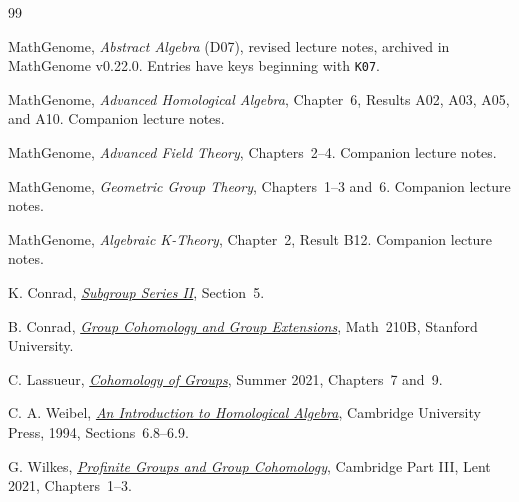 \documentclass[11pt,oneside,openany]{book}
\theoremstyle{definition}
\theoremstyle{remark}
\begin{document}
\backmatter
{\raggedright
\begin{thebibliography}{99}

MathGenome, \emph{Abstract Algebra} (D07), revised lecture notes,
archived in MathGenome v0.22.0. Entries have keys beginning with
\texttt{K07}.

MathGenome, \emph{Advanced Homological Algebra}, Chapter~6,
Results A02, A03, A05, and A10. Companion lecture notes.

MathGenome, \emph{Advanced Field Theory}, Chapters~2--4.
Companion lecture notes.

MathGenome, \emph{Geometric Group Theory}, Chapters~1--3 and~6.
Companion lecture notes.

MathGenome, \emph{Algebraic K-Theory}, Chapter~2, Result B12.
Companion lecture notes.

K. Conrad, \href{https://kconrad.math.uconn.edu/blurbs/grouptheory/subgpseries2.pdf}{\emph{Subgroup Series II}},
Section~5.

B. Conrad, \href{https://math.stanford.edu/~conrad/210BPage/handouts/gpext.pdf}{\emph{Group Cohomology and Group Extensions}},
Math~210B, Stanford University.

C. Lassueur, \href{https://classueur.github.io/maths/teaching/TUKL/SS21/COHOMSS21/CGSS21/COHOM_SS21.pdf}{\emph{Cohomology of Groups}},
Summer 2021, Chapters~7 and~9.

C. A. Weibel, \href{https://www.cambridge.org/core/books/an-introduction-to-homological-algebra/AAA3F16482097015CD12D4376D505282}{\emph{An Introduction to Homological Algebra}},
Cambridge University Press, 1994, Sections~6.8--6.9.

G. Wilkes, \href{https://www.dpmms.cam.ac.uk/~grw46/LectureNotes2021.pdf}{\emph{Profinite Groups and Group Cohomology}},
Cambridge Part III, Lent 2021, Chapters~1--3.

\end{thebibliography}
}
\end{document}
